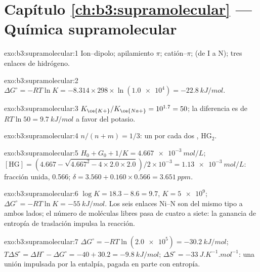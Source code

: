 \section*{Capítulo \ref{ch:b3:supramolecular} --- Química supramolecular}

\begin{solution}{exo:b3:supramolecular:1}
Ion--dipolo; apilamiento $\pi$; catión--$\pi$;  (de I a N); tres enlaces de hidrógeno.
\end{solution}

\begin{solution}{exo:b3:supramolecular:2}
$\Delta G^\circ = -RT\ln K = -8.314 \times 298 \times \ln(\num{1.0e4}) = \qty{-22.8}{kJ/mol}$.
\end{solution}

\begin{solution}{exo:b3:supramolecular:3}
$K_{\ce{K+}}/K_{\ce{Na+}} = 10^{1.7} = 50$; la diferencia es de $RT\ln 50 = \qty{9.7}{kJ/mol}$ a favor del potasio.
\end{solution}

\begin{solution}{exo:b3:supramolecular:4}
$n/(n + m) = 1/3$: un  por cada dos , $\mathrm{HG_2}$.
\end{solution}

\begin{solution}{exo:b3:supramolecular:5}
$H_0 + G_0 + 1/K = \qty{4.667e-3}{mol/L}$; $[\mathrm{HG}] = (4.667 - \sqrt{4.667^2 - 4 \times 2.0 \times 2.0})/2 \times 10^{-3} = \qty{1.13e-3}{mol/L}$: fracción
unida, 0.566; $\delta = 3.560 + 0.160 \times 0.566 = \qty{3.651}{ppm}$.
\end{solution}

\begin{solution}{exo:b3:supramolecular:6}
$\log K = 18.3 - 8.6 = 9.7$, $K = \num{5e9}$; $\Delta G^\circ = -RT\ln K = \qty{-55}{kJ/mol}$. Los seis enlaces Ni--N son del
mismo tipo a ambos lados; el número de moléculas libres pasa de cuatro a
siete: la ganancia de entropía de traslación impulsa la reacción.
\end{solution}

\begin{solution}{exo:b3:supramolecular:7}
$\Delta G^\circ = -RT\ln(\num{2.0e5}) = \qty{-30.2}{kJ/mol}$; $T\Delta S^\circ = \Delta H^\circ - \Delta G^\circ = -40 + 30.2 = \qty{-9.8}{kJ/mol}$;
$\Delta S^\circ = \qty{-33}{J.K^{-1}.mol^{-1}}$: una unión impulsada por la entalpía, pagada en parte con entropía.
\end{solution}

